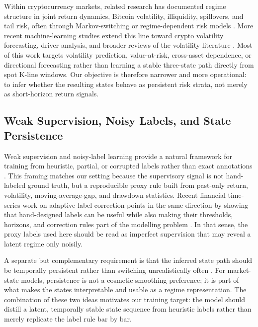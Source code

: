 \documentclass[a4paper,fleqn]{cas-dc}
\begin{document}
Within cryptocurrency markets, related research has documented regime structure in joint return dynamics, Bitcoin volatility, illiquidity, spillovers, and tail risk, often through Markov-switching or regime-dependent risk models \cite{figatalamanca2021crypto,ardia2019bitcoinvol,tan2021bitcoinmsgarch,elkhatib2024illiquid,kayal2024cryptovolnetwork,agakishiev2025forecasting,gao2022caviar,troster2019bitcoinrisk,borri2019tailrisk,koutmos2018liquidity,james2022evolutionary,shakourloo2026globaluncertainty}. More recent machine-learning studies extend this line toward crypto volatility forecasting, driver analysis, and broader reviews of the volatility literature \cite{wang2023cryptovolml,huang2024bitcoinvoldrivers,ahmed2024cryptovolreview}. Most of this work targets volatility prediction, value-at-risk, cross-asset dependence, or directional forecasting rather than learning a stable three-state path directly from spot K-line windows. Our objective is therefore narrower and more operational: to infer whether the resulting states behave as persistent risk strata, not merely as short-horizon return signals.

\subsection{Weak Supervision, Noisy Labels, and State Persistence}
Weak supervision and noisy-label learning provide a natural framework for training from heuristic, partial, or corrupted labels rather than exact annotations \cite{ratner2020snorkel,zhang2022programmatic,zhou2018weakly,hernandez2016taxonomy,schwenker2014partial,natarajan2013noisy,frenay2014labelnoise,song2023noisylabels,tonolini2023wsvae}. This framing matches our setting because the supervisory signal is not hand-labeled ground truth, but a reproducible proxy rule built from past-only return, volatility, moving-average-gap, and drawdown statistics. Recent financial time-series work on adaptive label correction points in the same direction by showing that hand-designed labels can be useful while also making their thresholds, horizons, and correction rules part of the modelling problem \cite{yang2024metalabel}. In that sense, the proxy labels used here should be read as imperfect supervision that may reveal a latent regime only noisily.

A separate but complementary requirement is that the inferred state path should be temporally persistent rather than switching unrealistically often \cite{nystrup2020persistent,bemporad2018jump,livieris2021smoothing,blumke2022structuralhmm}. For market-state models, persistence is not a cosmetic smoothing preference; it is part of what makes the states interpretable and usable as a regime representation. The combination of these two ideas motivates our training target: the model should distill a latent, temporally stable state sequence from heuristic labels rather than merely replicate the label rule bar by bar.
\end{document}
